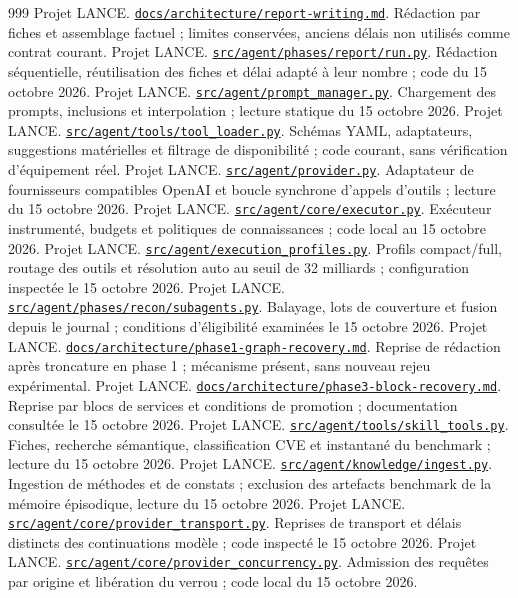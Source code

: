 \documentclass[11pt,a4paper]{article}
\newcommand{\source}[2]{\href{../../#1}{\nolinkurl{#1}}. #2}
\begin{document}
\begin{thebibliography}{999}
 Projet LANCE. \source{docs/architecture/report-writing.md}{Rédaction par fiches et assemblage factuel ; limites conservées, anciens délais non utilisés comme contrat courant.}
 Projet LANCE. \source{src/agent/phases/report/run.py}{Rédaction séquentielle, réutilisation des fiches et délai adapté à leur nombre ; code du 15 octobre 2026.}
 Projet LANCE. \source{src/agent/prompt_manager.py}{Chargement des prompts, inclusions et interpolation ; lecture statique du 15 octobre 2026.}
 Projet LANCE. \source{src/agent/tools/tool_loader.py}{Schémas YAML, adaptateurs, suggestions matérielles et filtrage de disponibilité ; code courant, sans vérification d’équipement réel.}
 Projet LANCE. \source{src/agent/provider.py}{Adaptateur de fournisseurs compatibles OpenAI et boucle synchrone d’appels d’outils ; lecture du 15 octobre 2026.}
 Projet LANCE. \source{src/agent/core/executor.py}{Exécuteur instrumenté, budgets et politiques de connaissances ; code local au 15 octobre 2026.}
 Projet LANCE. \source{src/agent/execution_profiles.py}{Profils compact/full, routage des outils et résolution auto au seuil de 32 milliards ; configuration inspectée le 15 octobre 2026.}
 Projet LANCE. \source{src/agent/phases/recon/subagents.py}{Balayage, lots de couverture et fusion depuis le journal ; conditions d’éligibilité examinées le 15 octobre 2026.}
 Projet LANCE. \source{docs/architecture/phase1-graph-recovery.md}{Reprise de rédaction après troncature en phase 1 ; mécanisme présent, sans nouveau rejeu expérimental.}
 Projet LANCE. \source{docs/architecture/phase3-block-recovery.md}{Reprise par blocs de services et conditions de promotion ; documentation consultée le 15 octobre 2026.}
 Projet LANCE. \source{src/agent/tools/skill_tools.py}{Fiches, recherche sémantique, classification CVE et instantané du benchmark ; lecture du 15 octobre 2026.}
 Projet LANCE. \source{src/agent/knowledge/ingest.py}{Ingestion de méthodes et de constats ; exclusion des artefacts benchmark de la mémoire épisodique, lecture du 15 octobre 2026.}
 Projet LANCE. \source{src/agent/core/provider_transport.py}{Reprises de transport et délais distincts des continuations modèle ; code inspecté le 15 octobre 2026.}
 Projet LANCE. \source{src/agent/core/provider_concurrency.py}{Admission des requêtes par origine et libération du verrou ; code local du 15 octobre 2026.}

\end{thebibliography}
\end{document}
